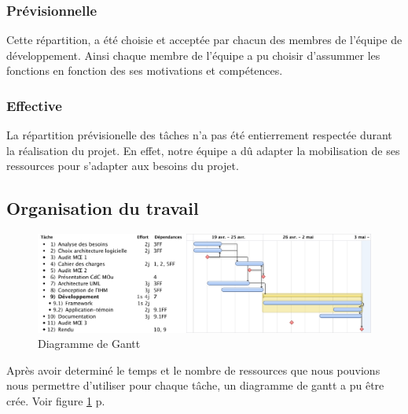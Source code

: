\subsubsection{Prévisionnelle}

Cette répartition, a été choisie et acceptée par chacun des membres de l'équipe de développement.
Ainsi chaque membre de l'équipe a pu choisir d'assummer les fonctions en fonction des ses motivations et compétences.

\subsubsection{Effective}

La répartition prévisionelle des tâches n'a pas été entierrement respectée durant la réalisation du projet.
En effet, notre équipe a dû adapter la mobilisation de ses ressources pour s'adapter aux besoins du projet.

\subsection{Organisation du travail}
\begin{figure}[thbp]
	\centering
		\includegraphics[angle=90, scale=0.7]{../diagrammes/gantt_final.pdf}
	\caption{Diagramme de Gantt}
	\label{fig:gantt}
\end{figure}

Après avoir determiné le temps et le nombre de ressources que nous pouvions nous permettre d'utiliser pour chaque tâche, un diagramme de gantt a pu être crée. Voir figure  \ref{fig:gantt} p.\pageref{fig:gantt}